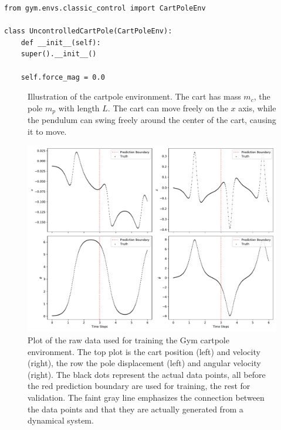 			\begin{lstlisting}[caption={Modification of Gym's cartpole environment to get an uncontrolled cartpole.}, label=lst:uncontrolledCartPole]
from gym.envs.classic_control import CartPoleEnv

class UncontrolledCartPole(CartPoleEnv):
	def __init__(self):
	super().__init__()

	self.force_mag = 0.0
			\end{lstlisting}

			\begin{figure}
				\centering
				\tikzCartpole
				\caption[Illustration of the cartpole environment]{Illustration of the cartpole environment. The cart has mass \(m_c\), the pole \(m_p\) with length \(L\). The cart can move freely on the \(x\) axis, while the pendulum can swing freely around the center of the cart, causing it to move.}
				\label{fig:envCartpoleGymSketch}
			\end{figure}

			\begin{figure}
				\centering
				\includegraphics[width=\linewidth]{figures/experiments/environments/observations-cartpole-gym-N0.pdf}
				\caption[Raw data of the cartpole environment]{Plot of the raw data used for training the Gym cartpole environment. The top plot is the cart position (left) and velocity (right), the row the pole displacement (left) and angular velocity (right). The black dots represent the actual data points, all before the red prediction boundary are used for training, the rest for validation. The faint gray line emphasizes the connection between the data points and that they are actually generated from a dynamical system.}
				\label{fig:envCartpoleGym}
			\end{figure}

